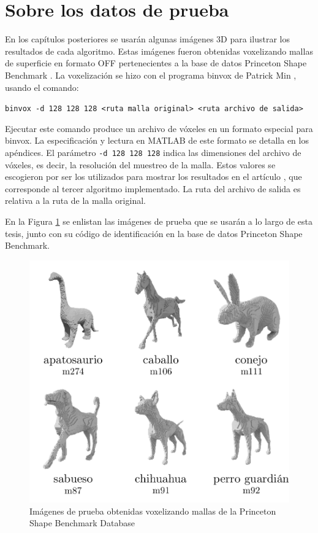 \section{Sobre los datos de prueba}

En los capítulos posteriores se usarán algunas imágenes 3D para ilustrar los resultados de cada algoritmo. Estas imágenes fueron obtenidas voxelizando mallas de superficie en formato OFF pertenecientes a la base de datos Princeton Shape Benchmark \cite{shilane2004princeton}. La voxelización se hizo con el programa binvox de Patrick Min \cite{patrick2011binvox}, usando el comando:

\begin{center}
\texttt{binvox -d 128 128 128 <ruta malla original> <ruta archivo de salida>}
\end{center}

Ejecutar este comando produce un archivo de vóxeles en un formato especial para binvox. La especificación y lectura en MATLAB de este formato se detalla en los apéndices. El parámetro \texttt{-d 128 128 128} indica las dimensiones del archivo de vóxeles, es decir, la resolución del muestreo de la malla. Estos valores se escogieron por ser los utilizados para mostrar los resultados en el artículo \cite{arcelli2011distance}, que corresponde al tercer algoritmo implementado. La ruta del archivo de salida es relativa a la ruta de la malla original.

En la Figura \ref{fig:test_models_psb} se enlistan las imágenes de prueba que se usarán a lo largo de esta tesis, junto con su código de identificación en la base de datos Princeton Shape Benchmark.

\begin{figure}[H]\centering
\includegraphics[width=0.8\linewidth]{images/test_models_psb}
\caption{Imágenes de prueba obtenidas voxelizando mallas de la Princeton Shape Benchmark Database}
\label{fig:test_models_psb}
\end{figure}

